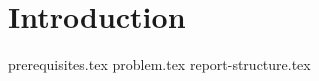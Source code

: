 \documentclass{article}
\begin{document}
\section{Introduction}


{prerequisites.tex}
{problem.tex}
{report-structure.tex}
\end{document}

